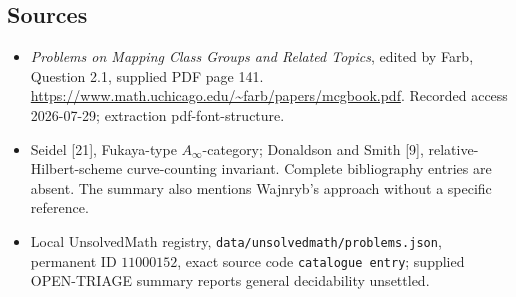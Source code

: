 \documentclass[11pt]{article}
\begin{document}
\subsection{Sources}
\begin{itemize}
\item \emph{Problems on Mapping Class Groups and Related Topics}, edited by Farb, Question 2.1, supplied PDF page 141. \url{https://www.math.uchicago.edu/~farb/papers/mcgbook.pdf}. Recorded access 2026-07-29; extraction pdf-font-structure.
\item Seidel [21], Fukaya-type \(A_\infty\)-category; Donaldson and Smith [9], relative-Hilbert-scheme curve-counting invariant. Complete bibliography entries are absent. The summary also mentions Wajnryb's approach without a specific reference.
\item Local UnsolvedMath registry, \texttt{data/unsolvedmath/problems.json}, permanent ID \(11000152\), exact source code \texttt{catalogue entry}; supplied OPEN-TRIAGE summary reports general decidability unsettled.
\end{itemize}
\end{document}
